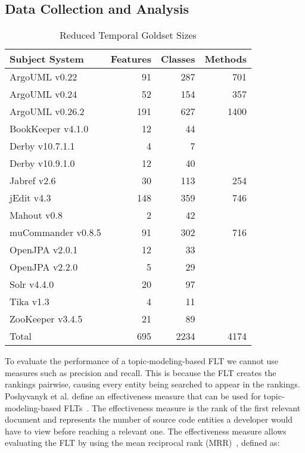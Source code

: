 

\subsection{Data Collection and Analysis}
\label{sec:data}

\begin{table}[t]
\renewcommand{\arraystretch}{1.3}
\footnotesize
\centering
\caption{Reduced Temporal Goldset Sizes}
\begin{tabular}{lrrr}
    \toprule
    Subject System     & Features & Classes & Methods \\
    \midrule
    ArgoUML v0.22      & 91       & 287     & 701     \\
    ArgoUML v0.24      & 52       & 154     & 357     \\
    ArgoUML v0.26.2    & 191      & 627     & 1400    \\
    BookKeeper v4.1.0  & 12       & 44      &         \\
    Derby v10.7.1.1    & 4        & 7       &         \\
    Derby v10.9.1.0    & 12       & 40      &         \\
    Jabref v2.6        & 30       & 113     & 254     \\
    jEdit v4.3         & 148      & 359     & 746     \\
    Mahout v0.8        & 2        & 42      &         \\
    muCommander v0.8.5 & 91       & 302     & 716     \\
    OpenJPA v2.0.1     & 12       & 33      &         \\
    OpenJPA v2.2.0     & 5        & 29      &         \\
    Solr v4.4.0        & 20       & 97      &         \\
    Tika v1.3          & 4        & 11      &         \\
    ZooKeeper v3.4.5   & 21       & 89      &         \\
    \midrule
Total                  & 695      & 2234    & 4174    \\
    \bottomrule
\end{tabular}
\label{table:subjects:temporal}
\end{table}

To evaluate the performance of a topic-modeling-based FLT we cannot use
measures such as precision and recall. This is because the FLT creates
the rankings pairwise, causing every entity being searched to appear in the rankings.
Poshyvanyk et al. define an effectiveness measure that can be used for topic-modeling-based FLTs~\cite{Poshyvanyk-etal:2007}.
The effectiveness measure is the rank of the first relevant document
and represents the number of source code entities a developer would have to view before reaching a relevant one.
The effectiveness measure allows evaluating the FLT by using
the mean reciprocal rank (MRR)~\cite{Voorhees:1999}, defined as:


